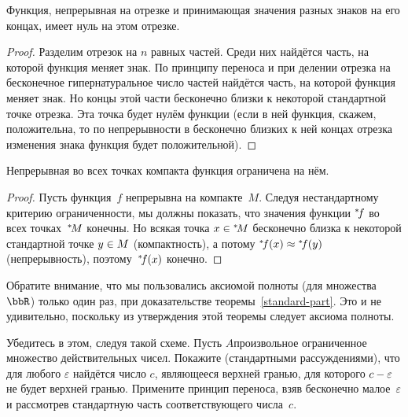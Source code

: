 \begin{theorem}
Функция, непрерывная на отрезке и принимающая значения разных
знаков на его концах, имеет нуль на этом отрезке.
\end{theorem}

\begin{proof}
Разделим отрезок на $n$ равных частей. Среди них найдётся часть,
на которой функция меняет знак. По принципу переноса и при
делении отрезка на бесконечное гипернатуральное число частей
найдётся часть, на которой функция меняет знак. Но концы этой
части бесконечно близки к некоторой стандартной точке отрезка.
Эта точка будет нулём функции (если в ней функция, скажем,
положительна, то по непрерывности в бесконечно близких к ней
концах отрезка изменения знака функция будет положительной).
\end{proof}

\begin{theorem}
Непрерывная во всех точках компакта функция ограничена на нём.
\end{theorem}

\begin{proof}
Пусть функция~$f$ непрерывна на компакте~$M$. Следуя
нестандартному критерию ограниченности, мы должны показать, что
значения функции ${}^*\!f$ во всех точках~${}^*\!M$ конечны. Но
всякая точка $x\hm\in\nst{M}$ бесконечно близка к некоторой
стандартной точке $y\hm\in M$ (компактность), а потому
$\nst{f}(x)\hm\approx\nst{f}(y)$ (непрерывность),
поэтому~${}^*\!f(x)$ конечно.
\end{proof}

Обратите внимание, что мы пользовались аксиомой полноты (для
множества~$\bbR$) только один раз, при доказательстве
теоремы~\ref{standard-part}. Это и не удивительно, поскольку из
утверждения этой теоремы следует аксиома полноты.

\begin{problem}
Убедитесь в этом, следуя такой схеме. Пусть $A$\т произвольное
ограниченное
множество действительных чисел. Покажите (стандартными
рассуждениями), что для любого $\varepsilon$
найдётся число $c$, являющееся верхней гранью, для которого
$c\hm-\varepsilon$ не будет верхней гранью. Примените
принцип переноса, взяв бесконечно малое~$\varepsilon$ и
рассмотрев стандартную часть соответствующего числа~$c$.
\end{problem}

